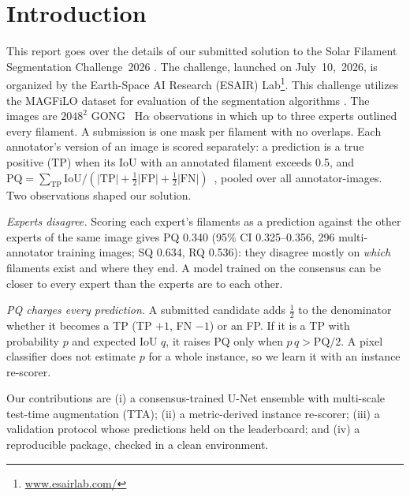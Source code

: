 \documentclass[sigconf]{acmart}
\begin{document}
\section{Introduction}
    This report goes over the details of our submitted solution to the Solar Filament Segmentation Challenge~2026 \cite{filament-segmentation-2026}. The challenge, launched on July~10,~2026, is organized by the Earth-Space AI Research (ESAIR) Lab\footnote{\href{https://www.esairlab.com/home}{www.esairlab.com/}}. This challenge utilizes the MAGFiLO dataset for evaluation of the segmentation algorithms \cite{ahmadzadeh2024dataset}.
The images are $2048^2$ GONG~\cite{gong1996} H$\alpha$ observations in which up to three experts outlined every
filament. A submission is one mask per filament with no overlaps. Each annotator's version of an image is
scored separately: a prediction is a true positive (TP) when its IoU with an annotated filament exceeds 0.5, and
$\mathrm{PQ}=\sum_{\mathrm{TP}}\mathrm{IoU}/(|\mathrm{TP}|+\frac12|\mathrm{FP}|+\frac12|\mathrm{FN}|)$~\cite{kirillov2019panoptic},
pooled over all annotator-images. Two observations shaped our solution.

\emph{Experts disagree.} Scoring each expert's filaments as a prediction against the other experts of the same image gives
PQ 0.340 (95\% CI 0.325--0.356, 296 multi-annotator training images; SQ 0.634, RQ 0.536): they disagree mostly on
\emph{which} filaments exist and where they end. A model trained on the consensus can be closer to every expert than the
experts are to each other.

\emph{PQ charges every prediction.} A submitted candidate adds $\frac12$ to the denominator whether it becomes a TP (TP $+1$,
FN $-1$) or an FP. If it is a TP with probability $p$ and expected IoU $q$, it raises PQ only when $p\,q>\mathrm{PQ}/2$. A
pixel classifier does not estimate $p$ for a whole instance, so we learn it with an instance re-scorer.

Our contributions are (i) a consensus-trained U-Net ensemble with multi-scale test-time augmentation (TTA); (ii) a
metric-derived instance re-scorer; (iii) a validation protocol whose predictions held on the leaderboard; and (iv) a
reproducible package, checked in a clean environment.

\end{document}
